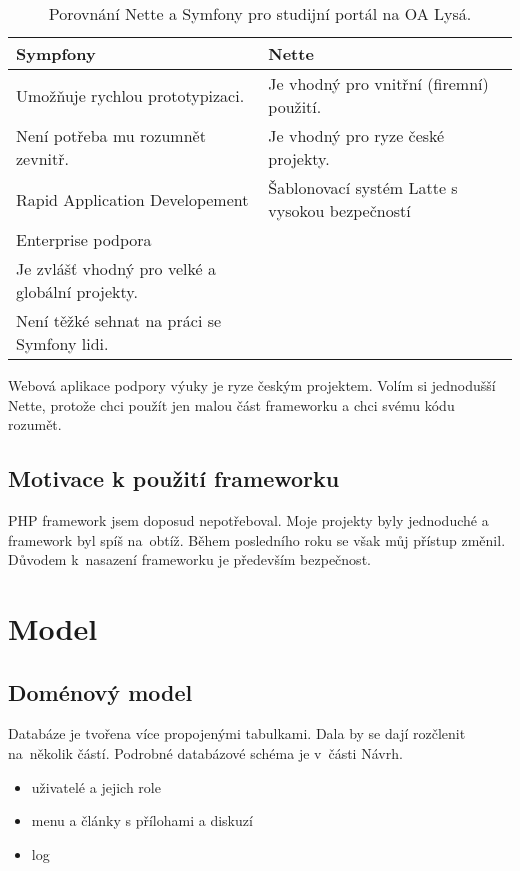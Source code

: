 \documentclass[thesis=B,czech]{FITthesis}[2012/06/26]
\begin{document}
\begin{table}
\centering
\begin{tabular}{| p{5cm} | p{5cm} |}
  \hline
    \bfseries Sympfony & \bfseries Nette \\
    \hline
    Umožňuje rychlou prototypizaci. & Je vhodný pro vnitřní (firemní) použití. \\
    Není potřeba mu rozumnět zevnitř. & Je vhodný pro ryze české projekty.\\
    Rapid Application Developement &  Šablonovací systém Latte s vysokou bezpečností \cite{phpfashion}\\
    Enterprise podpora &  \\
    Je zvlášť vhodný pro velké a globální projekty. &  \\
    Není těžké sehnat na práci se Symfony lidi. & \\ 
    \hline
\end{tabular}
\caption[Porovnání Nette a Symfony]{Porovnání Nette a Symfony pro studijní portál na OA Lysá. }
\label{table:frameworsk}
\end{table}

Webová aplikace podpory výuky je ryze českým projektem. Volím si jednodušší Nette, protože chci použít jen malou část frameworku a chci svému kódu rozumět.

\subsection{Motivace k použití frameworku}

PHP framework jsem doposud nepotřeboval. Moje projekty byly jednoduché a framework byl spíš na~obtíž. Během posledního roku se však můj přístup změnil. Důvodem k~nasazení frameworku je především bezpečnost.

\section{Model}

\subsection{Doménový model}

Databáze je tvořena více propojenými tabulkami. Dala by se dají rozčlenit na~několik částí. Podrobné databázové schéma je v~části Návrh.
\begin{itemize}
	\item uživatelé a jejich role
	\item menu a články s přílohami a diskuzí
	\item log
\end{itemize}
\end{document}
